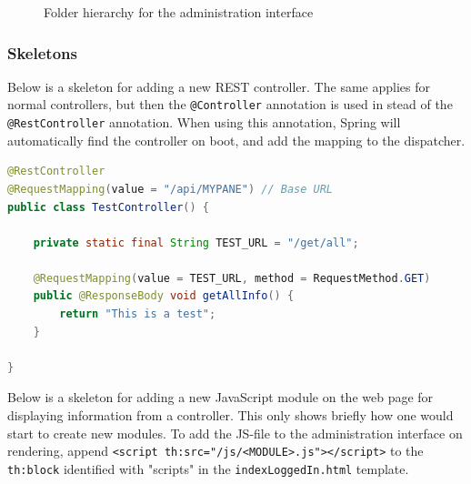 \begin{center}
  \begin{figure}[ht!]
    \caption{Folder hierarchy for the administration interface}
    \label{fig:oac-folder-hierarchy}
  \end{figure}
\end{center}



\subsubsection{Skeletons}
\label{subsubsec:skeletons}

Below is a skeleton for adding a new REST controller. The same applies for normal controllers, but then the \verb!@Controller! annotation is used in stead of the \verb!@RestController! annotation. When using this annotation, Spring will automatically find the controller on boot, and add the mapping to the dispatcher. 

\begin{lstlisting}[language=Java, captionpos=b, caption=Skeleton for a REST-controller, frame=bt, showstringspaces=false]
@RestController
@RequestMapping(value = "/api/MYPANE") // Base URL
public class TestController() {
    
    private static final String TEST_URL = "/get/all";
    
    @RequestMapping(value = TEST_URL, method = RequestMethod.GET)
    public @ResponseBody void getAllInfo() {
        return "This is a test";
    }
    
}
\end{lstlisting}

Below is a skeleton for adding a new JavaScript module on the web page for displaying information from a controller. This only shows briefly how one would start to create new modules. To add the JS-file to the administration interface on rendering, append \verb!<script th:src="/js/<MODULE>.js"></script>! to the \verb!th:block! identified with "scripts" in the \verb!indexLoggedIn.html! template. \\ 

